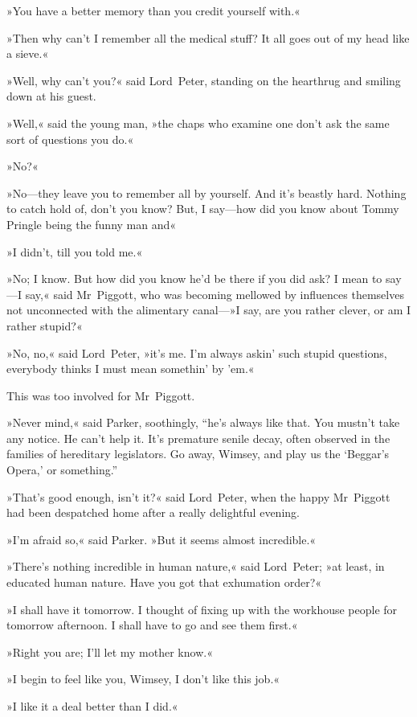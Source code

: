 »You have a better memory than you credit yourself with.«

»Then why can't I remember all the medical stuff? It all goes out of my head like a sieve.«

»Well, why can't you?« said Lord~Peter, standing on the hearthrug and smiling down at his guest.

»Well,« said the young man, »the chaps who examine one don't ask the same sort of questions you do.«

»No?«

»No—they leave you to remember all by yourself. And it's beastly hard. Nothing to catch hold of, don't you know? But, I say—how did you know about Tommy Pringle being the funny man and\longdash«

»I didn't, till you told me.«

»No; I know. But how did you know he'd be there if you did ask? I mean to say—I say,« said Mr~Piggott, who was becoming mellowed by influences themselves not unconnected with the alimentary canal---»I say, are you rather clever, or am I rather stupid?«

»No, no,« said Lord~Peter, »it's me. I'm always askin' such stupid questions, everybody thinks I must mean somethin' by 'em.«

This was too involved for Mr~Piggott.

»Never mind,« said Parker, soothingly, “he's always like that. You mustn't take any notice. He can't help it. It's premature senile decay, often observed in the families of hereditary legislators. Go away, Wimsey, and play us the ‘Beggar's Opera,' or something.”

»That's good enough, isn't it?« said Lord~Peter, when the happy Mr~Piggott had been despatched home after a really delightful evening.

»I'm afraid so,« said Parker. »But it seems almost incredible.«

»There's nothing incredible in human nature,« said Lord~Peter; »at least, in educated human nature. Have you got that exhumation order?«

»I shall have it tomorrow. I thought of fixing up with the workhouse people for tomorrow afternoon. I shall have to go and see them first.«

»Right you are; I'll let my mother know.«

»I begin to feel like you, Wimsey, I don't like this job.«

»I like it a deal better than I did.«

